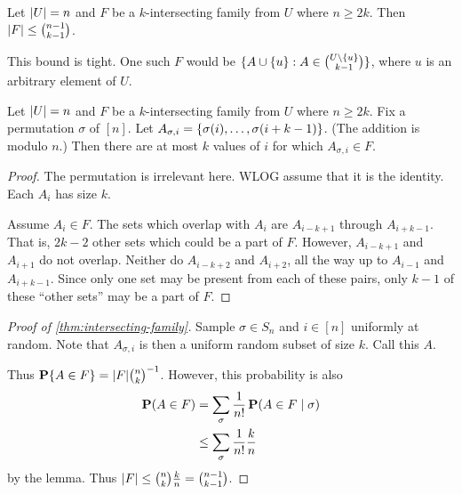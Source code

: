 \begin{theorem} \label{thm:intersecting-family}
    Let $\abs{U} = n$ and $F$ be a $k$-intersecting family from $U$
    where $n \ge 2k$.
    Then $\abs{F} \le \binom{n-1}{k-1}$.
\end{theorem}
This bound is tight.
One such $F$ would be $\set{A \cup \set u : A \in \binom{U \setminus \set u}{k-1}}$,
where $u$ is an arbitrary element of $U$.
\begin{lemma}
    Let $\abs{U} = n$ and $F$ be a $k$-intersecting family from $U$
    where $n \ge 2k$.
    Fix a permutation $\sigma$ of $[n]$.
    Let $A_{\sigma, i} = \set{\sigma(i), \dots, \sigma(i+k-1)}$.
    (The addition is modulo $n$.)
    Then there are at most $k$ values of $i$ for which $A_{\sigma,i} \in F$.
\end{lemma}
\begin{proof}
    The permutation is irrelevant here.
    WLOG assume that it is the identity.
    Each $A_i$ has size $k$.

    Assume $A_i \in F$.
    The sets which overlap with $A_i$ are $A_{i-k+1}$ through
    $A_{i+k-1}$.
    That is, $2k - 2$ other sets which could be a part of $F$.
    However, $A_{i-k+1}$ and $A_{i+1}$ do not overlap.
    Neither do $A_{i-k+2}$ and $A_{i+2}$, all
    the way up to $A_{i-1}$ and $A_{i+k-1}$.
    Since only one set may be present from each of these pairs,
    only $k - 1$ of these ``other sets'' may be a part of $F$.
\end{proof}

\begin{proof}[Proof of \cref{thm:intersecting-family}]
    Sample $\sigma \in S_n$ and $i \in [n]$ uniformly at random.
    Note that $A_{\sigma, i}$ is then a uniform random subset of size $k$.
    Call this $A$.

    Thus $\P\set{A \in F} = \abs{F} \binom{n}{k}^{-1}$.
    However, this probability is also \begin{align*}
        \P(A \in F)
            &= \sum_\sigma \frac1{n!} \P(A \in F \mid \sigma) \\
            &\le \sum_\sigma \frac1{n!} \frac kn
    \end{align*}
    by the lemma.
    Thus $\abs{F} \le \binom nk \frac kn = \binom{n-1}{k-1}$.
\end{proof}
